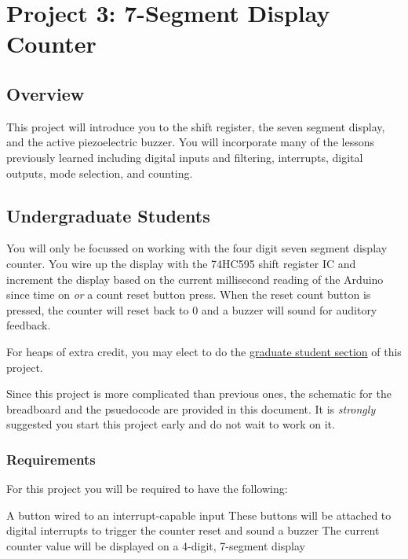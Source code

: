 %

\chapter{Project 3: 7-Segment Display Counter}

\section*{Overview}
This project will introduce you to the shift register, the seven segment display, and the active piezoelectric buzzer.
You will incorporate many of the lessons previously learned including digital inputs and filtering, interrupts, digital outputs, mode selection, and counting.

\section*{Undergraduate Students}
You will only be focussed on working with the four digit seven segment display counter.
You wire up the display with the 74HC595 shift register IC and increment the display based on the current millisecond reading of the Arduino since time on \emph{or} a count reset button press.
When the reset count button is pressed, the counter will reset back to 0 and a buzzer will sound for auditory feedback.


For heaps of extra credit, you may elect to do the \hyperref[sec:p3_grad_students]{graduate student section} of this project.

Since this project is more complicated than previous ones, the schematic for the breadboard and the psuedocode are provided in this document. It is \emph{strongly} suggested you start this project early and do not wait to work on it.

    \subsection*{Requirements}
    For this project you will be required to have the following:
    \begin{outline}
        \1 A button wired to an interrupt-capable input
            \2 These buttons will be attached to digital interrupts to trigger the counter reset and sound a buzzer
        \1 The current counter value will be displayed on a 4-digit, 7-segment display
    \end{outline}

